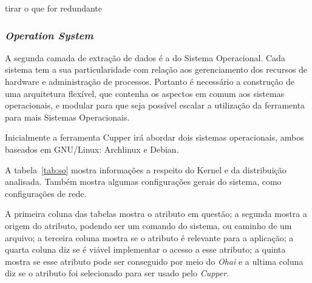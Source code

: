 {\color{red} tirar o que for redundante}


\subsubsection{\textit{Operation System}}
\label{sec:cam-os}

A segunda camada de extração de dados é a do Sistema Operacional. 
Cada sistema tem a sua particularidade com relação aos gerenciamento dos 
recursos de hardware e administração de processos. Portanto é necessário a 
construção de uma arquitetura flexível, que contenha os aspectos em comum aos
sistemas operacionais, e modular para que seja possível escalar a utilização 
da ferramenta para mais Sistemas Operacionais.

Inicialmente a ferramenta Cupper irá abordar dois sistemas operacionais, 
ambos baseados em GNU/Linux: Archlinux e Debian.

A tabela~\ref{tab:so} mostra informações a respeito do Kernel e da distribuição
analisada. Também mostra algumas configurações gerais do sistema, como
configurações de rede.

A primeira coluna das tabelas mostra o atributo em questão; a segunda mostra
a origem do atributo, podendo ser um comando do sistema, ou caminho de um arquivo;
a terceira coluna mostra se o atributo é relevante para a aplicação; a quarta
coluna diz se é viável implementar o acesso a esse atributo; a quinta mostra se
esse atributo pode ser conseguido por meio do \textit{Ohai} e a ultima coluna
diz se o atributo foi selecionado para ser usado pelo \textit{Cupper}.


